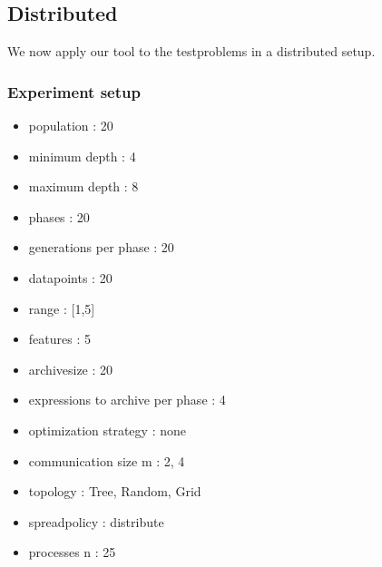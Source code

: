\subsection{Distributed}
We now apply our tool to the testproblems in a distributed setup.

\subsubsection{Experiment setup}
\begin{itemize}
\item population : 20
\item minimum depth : 4
\item maximum depth : 8
\item phases : 20
\item generations per phase : 20
\item datapoints : 20
\item range : [1,5]
\item features : 5
\item archivesize : 20
\item expressions to archive per phase : 4
\item optimization strategy : none
\item communication size m : 2, 4
\item topology : Tree, Random, Grid
\item spreadpolicy : distribute
\item processes n : 25
\end{itemize}
